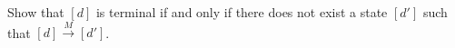 Show that $[d]$ is terminal if and only if there does not exist a state $[d']$ such that $[d] \xrightarrow{M} [d']$.
